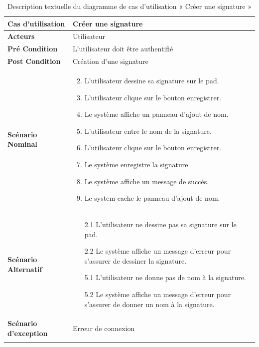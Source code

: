 \begin{longtable}{|p{5cm}|p{10cm}|}
\hline
\textbf{Cas d'utilisation}&Créer une signature\\
\hline
\textbf{Acteurs}&Utilisateur\\
\hline
\textbf{Pré Condition}&L'utilisateur doit être authentifié\\
\hline
\textbf{Post Condition}&Création d'une signature\\
\hline
\textbf{Scénario Nominal}&
\vspace{-\baselineskip}
\begin{enumerate}
    \setcounter{enumi}{1}
  \item L'utilisateur dessine sa signature sur le pad.
  \item L'utilisateur clique sur le bouton enregistrer.
  \item Le système affiche un panneau d'ajout de nom.
  \item L'utilisateur entre le nom de la signature.
  \item L'utilisateur clique sur le bouton enregistrer.
  \item Le système enregistre la signature.
  \item Le système affiche un message de succès.
  \item Le system cache le panneau d'ajout de nom.
\end{enumerate}\\
\hline
\textbf{Scénario Alternatif}&
\vspace{-\baselineskip}
\begin{enumerate}
      \item [2.1] L'utilisateur ne dessine pas sa signature sur le pad.
      \item [2.2] Le système affiche un message d'erreur pour s'assurer de dessiner la signature.
      \item [5.1] L'utilisateur ne donne pas de nom à la signature.
      \item [5.2] Le système affiche un message d'erreur pour s'assurer de donner un nom à la signature.
\end{enumerate}\\
\hline
\textbf{Scénario d'exception}&Erreur de connexion\\
\hline
\caption{Description textuelle du diagramme de cas d'utilisation « Créer une signature »}
\label{tab:use_case_create_signature}
\end{longtable}

  

